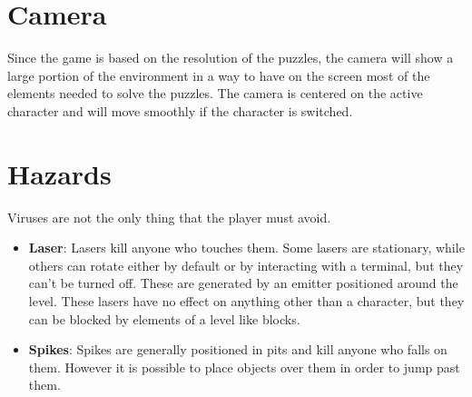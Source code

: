 \documentclass[12pt, a4paper]{report}
\begin{document}
\section*{Camera}

Since the game is based on the resolution of the puzzles, the camera will show a large portion of the environment in a way to have on the screen most of the elements needed to solve the puzzles. The camera is centered on the active character and will move smoothly if the character is switched.

\section*{Hazards}
Viruses are not the only thing that the player must avoid.
\begin{itemize}
	\item \textbf{Laser}: Lasers kill anyone who touches them. Some lasers are stationary, while others can rotate either by default or by interacting with a 			terminal, but they can't be turned off. These are generated by an emitter positioned around the level. These lasers have no effect on anything other than a character, but they can be blocked by elements of a level like blocks.
	\item \textbf{Spikes}: Spikes are generally positioned in pits and kill anyone who falls on them. However it is possible to place objects over them in order to jump past them.
\end{itemize}
\end{document}
